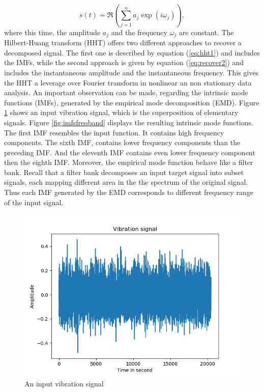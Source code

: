 \documentclass[../Main/thesis.tex]{subfiles}
\begin{document}
\begin{equation}\label{eq:recoverFourier}
s(t) = \Re{\left( \sum_{j=1}^{n}a_{j}\exp\left(i\omega_{j}\right)  \right)},
\end{equation} 
where this time, the amplitude $a_{j}$ and the frequency $\omega_{j}$ are constant. The Hilbert-Huang transform (HHT) offers two different approaches to recover a decomposed signal. The first one is described by equation (\ref{eq:hht1}) and includes the IMFs, while the second approach is given by equation (\ref{eq:recover2}) and includes the instantaneous amplitude and the instantaneous frequency. This gives the HHT a leverage over Fourier transform in nonlinear an non stationary data analysis.
\justify
An important observation can be made, regarding the intrinsic mode functions (IMFs), generated by the empirical mode decomposition (EMD). Figure \ref{fig:input} shows an input vibration signal, which is the superposition of elementary signals. Figure \ref{fig:imfsfreqband} displays the resulting intrinsic mode functions. The first IMF resembles the input function. It contains high frequency components. The sixth IMF, contains lower frequency components than the preceding IMF. And the eleventh IMF contains even lower frequency component then the eighth IMF. Moreover, the empirical mode function behave like a filter bank. Recall that a filter bank decomposes an input target signal into subset signals, each mapping different area in the the spectrum of the original signal. Thus each IMF generated by the EMD corresponds to different frequency range of the input signal.
\begin{figure}[H]
	\centering
	\includegraphics[width=0.7\linewidth]{../fig/input}
	\caption{An input vibration signal}
	\label{fig:input}
\end{figure}
\end{document}
